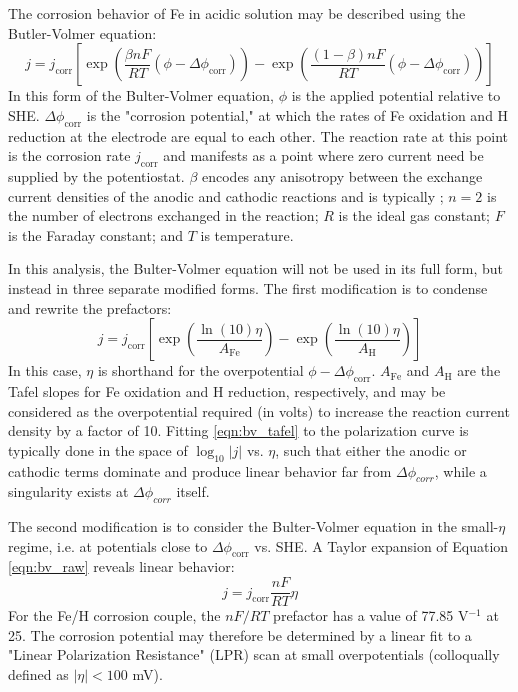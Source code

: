 The corrosion behavior of Fe in acidic solution may be described using the Butler-Volmer equation:
%
	\begin{equation}
		j = j_{\text{corr}} \left[
		\exp\left(\frac{\beta n F}{RT}(\phi - \Delta\phi_{\text{corr}})\right)
		-\exp\left(\frac{(1-\beta) n F}{RT}(\phi - \Delta\phi_{\text{corr}})\right)
		\right]
	\label{eqn:bv_raw}
	\end{equation}
%
In this form of the Bulter-Volmer equation, $\phi$ is the applied potential relative to SHE.  $\Delta \phi_{\text{corr}}$ is the "corrosion potential," at which the rates of Fe oxidation and H reduction at the electrode are equal to each other.  The reaction rate at this point is the corrosion rate $j_{\text{corr}}$ and manifests as a point where zero current need be supplied by the potentiostat.  $\beta$ encodes any anisotropy between the exchange current densities of the anodic and cathodic reactions and is typically ; $n = 2$ is the number of electrons exchanged in the reaction; $R$ is the ideal gas constant; $F$ is the Faraday constant; and $T$ is temperature.\cite{gsi}

In this analysis, the Bulter-Volmer equation will not be used in its full form, but instead in three separate modified forms.  The first modification is to condense and rewrite the prefactors:
%
	\begin{equation}
		j = j_{\text{corr}} \left[
		\exp\left(\frac{\ln(10)\eta}{A_{\text{Fe}}}\right)
		-\exp\left(\frac{\ln(10)\eta}{A_{\text{H}}}\right)
		\right]
	\label{eqn:bv_tafel}
	\end{equation}
%
In this case, $\eta$ is shorthand for the overpotential $\phi - \Delta\phi_{\text{corr}}$.  $A_{\text{Fe}}$ and $A_{\text{H}}$ are the Tafel slopes for Fe oxidation and H reduction, respectively, and may be considered as the overpotential required (in volts) to increase the reaction current density by a factor of 10.  Fitting \ref{eqn:bv_tafel} to the polarization curve is typically done in the space of $\log_{10}|j|$ vs. $\eta$, such that either the anodic or cathodic terms dominate and produce linear behavior far from $\Delta \phi_{corr}$, while a singularity exists at $\Delta \phi_{corr}$ itself.\cite{gsi}

The second modification is to consider the Bulter-Volmer equation in the small-$\eta$ regime, i.e. at potentials close to $\Delta \phi_{\text{corr}}$ vs. SHE.  A Taylor expansion of Equation \ref{eqn:bv_raw} reveals linear behavior:
%
	\begin{equation}
		j = j_{\text{corr}}\frac{nF}{RT}\eta
	\label{eqn:bv_lpr}
	\end{equation}
%
For the Fe/H corrosion couple, the $nF/RT$ prefactor has a value of 77.85 V$^{-1}$ at 25. The corrosion potential may therefore be determined by a linear fit to a "Linear Polarization Resistance" (LPR) scan at small overpotentials (colloqually defined as $|\eta| < 100$ mV).\cite{gsi}


